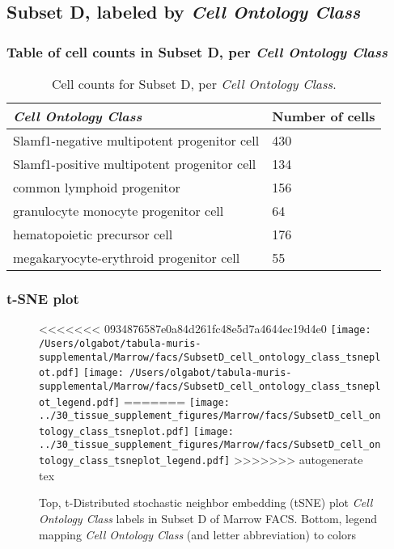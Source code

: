 \clearpage

\subsection{Subset D, labeled by \emph{Cell Ontology Class}}
\subsubsection{Table of cell counts in Subset D, per \emph{Cell Ontology Class}}\begin{table}[h]
\centering
\label{my-label}
\begin{tabular}{@{}ll@{}}
\toprule

\emph{Cell Ontology Class}& Number of cells \\ \midrule
Slamf1-negative multipotent progenitor cell & 430 \\

Slamf1-positive multipotent progenitor cell & 134 \\

common lymphoid progenitor & 156 \\

granulocyte monocyte progenitor cell & 64 \\

hematopoietic precursor cell & 176 \\

megakaryocyte-erythroid progenitor cell & 55 \\
\bottomrule
\end{tabular}
\caption{Cell counts for Subset D, per \emph{Cell Ontology Class}.}
\end{table}

\clearpage
\subsubsection{t-SNE plot}
\begin{figure}[h]
\centering
<<<<<<< 0934876587e0a84d261fc48e5d7a4644ec19d4e0
\texttt{[image: /Users/olgabot/tabula-muris-supplemental/Marrow/facs/SubsetD\_cell\_ontology\_class\_tsneplot.pdf]}
\texttt{[image: /Users/olgabot/tabula-muris-supplemental/Marrow/facs/SubsetD\_cell\_ontology\_class\_tsneplot\_legend.pdf]}
=======
\texttt{[image: ../30\_tissue\_supplement\_figures/Marrow/facs/SubsetD\_cell\_ontology\_class\_tsneplot.pdf]}
\texttt{[image: ../30\_tissue\_supplement\_figures/Marrow/facs/SubsetD\_cell\_ontology\_class\_tsneplot\_legend.pdf]}
>>>>>>> autogenerate tex
\caption{Top, t-Distributed stochastic neighbor embedding (tSNE) plot  \emph{Cell Ontology Class} labels in Subset D of Marrow FACS. Bottom, legend mapping \emph{Cell Ontology Class} (and letter abbreviation) to colors}
\end{figure}


